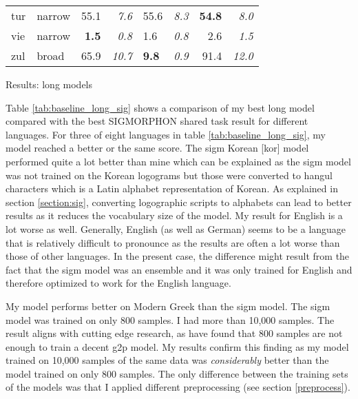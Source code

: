 {\begin{tabularx}{1.2\textwidth}{|l|X||r|r||X|X||r|r|}
tur       & narrow        & 55.1         & \textit{7.6}    & 55.6         & \textit{8.3}          & \textbf{54.8}   & \textit{8.0}    \\
vie       & narrow        & \textbf{1.5} & \textit{0.8}    & 1.6          & \textit{0.8}          & 2.6    & \textit{1.5}    \\
zul       & broad         & 65.9         & \textit{10.7}   & \textbf{9.8}          & \textit{0.9}          & 91.4   & \textit{12.0}   \\ \hline
\end{tabularx}
}{Results: long models}

Table \ref{tab:baseline_long_sig} shows a comparison of my best long model compared with the best SIGMORPHON shared task result for different languages. For three of eight languages in table \ref{tab:baseline_long_sig}, my model reached a better or the same score. The \ac{sigm} Korean [kor] model performed quite a lot better than mine which can be explained as the \ac{sigm} model was not trained on the Korean logograms but those were converted to hangul characters which is a Latin alphabet representation of Korean. As explained in section \ref{section:sig}, converting logographic scripts to alphabets can lead to better results as it reduces the vocabulary size of the model. My result for English is a lot worse as well. Generally, English (as well as German) seems to be a language that is relatively difficult to pronounce as the results are often a lot worse than those of other languages. In the present case, the difference might result from the fact that the \ac{sigm} model was an ensemble and it was only trained for English and therefore optimized to work for the English language. 

My model performs better on Modern Greek than the \ac{sigm} model. The \ac{sigm} model was trained on only 800 samples. I had more than 10,000 samples. The result aligns with cutting edge research, as \citet{Ashby-Bartley.2021} have found that 800 samples are not enough to train a decent \ac{g2p} model. My results confirm this finding as my model trained on 10,000 samples of the same data was \textit{considerably} better than the model trained on only 800 samples. The only difference between the training sets of the models was that I applied different preprocessing (see section \ref{preprocess}). 

